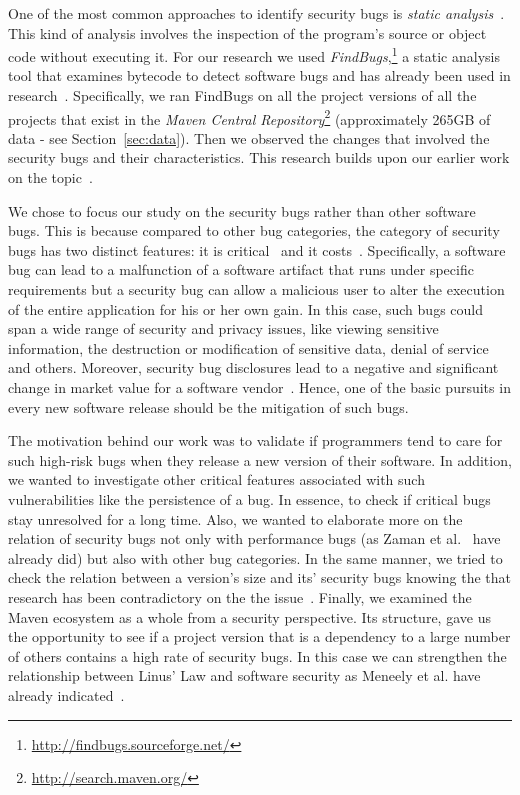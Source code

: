 \documentclass[conference]{llncs}
\begin{document}
One of the most common approaches to identify security bugs is
{\it static analysis}~\cite{CW07}. This kind of analysis involves the
inspection of the program's source or object code without executing
it. For our research we used {\it FindBugs},\footnote{\url{http://findbugs.sourceforge.net/}}
a static analysis tool that examines bytecode to detect software bugs and has already been used in
research~\cite{AP10}\cite{HP07}\cite{HP04}\cite{HW08}\cite{SHP06}.
Specifically, we ran FindBugs on all the project
versions of all the projects that exist in the
{\it Maven Central Repository}\footnote{\url{http://search.maven.org/}}
(approximately 265GB of data - see Section~\ref{sec:data}).
Then we observed the changes that involved the security bugs and their characteristics.
This research builds upon our earlier work on the topic~\cite{MGS12}.

We chose to focus our study on the security bugs rather than other
software bugs. This is because compared to other bug categories,
the category of security bugs has two distinct features: it is critical~\cite{SZ12}
and it costs~\cite{BCL08}\cite{R06}. Specifically, a software bug can
lead to a malfunction of a software artifact that runs under specific
requirements but a security bug can allow a malicious user to alter the execution
of the entire application for his or her own gain. In this case, such bugs could span a wide
range of security and privacy issues, like viewing sensitive information, the destruction or
modification of sensitive data, denial of service and others.
Moreover, security bug disclosures lead to a negative and significant change
in market value for a software vendor~\cite{TW07}.
Hence, one of the basic pursuits in every new software release should
be the mitigation of such bugs.

The motivation behind our work was to validate if programmers tend to care for
such high-risk bugs when they release a new version of their software. In
addition, we wanted to investigate other critical features associated with such
vulnerabilities like the persistence of a bug. In essence, to check if critical bugs stay
unresolved for a long time. Also, we wanted to elaborate more on the relation of security
bugs not only with performance bugs (as Zaman et al.~\cite{ZAH11} have already
did) but also with other bug categories. In the same manner, we tried to check
the relation between a version's size and its' security bugs knowing the
that research has been contradictory on the the
issue~\cite{BP84}\cite{SYTP85}\cite{NBZ06}\cite{GKMS00}.
Finally, we examined the Maven ecosystem as a whole from a security
perspective. Its structure, gave us the opportunity to see if a project version that is a dependency to
a large number of others contains a high rate of security bugs.
In this case we can strengthen the relationship between Linus' Law and
software security as Meneely et al. have already indicated~\cite{MW10}.
\end{document}
